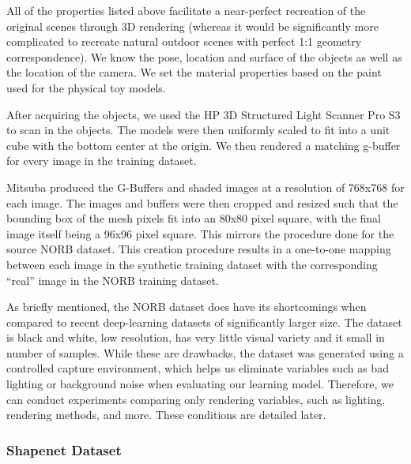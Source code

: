 \documentclass[10pt,twocolumn,letterpaper]{article}
\begin{document}
 All of the properties listed above facilitate a near-perfect recreation of the original scenes through 3D rendering (whereas it would be significantly more complicated to recreate natural outdoor scenes with perfect 1:1 geometry correspondence). We know the pose, location and surface of the objects as well as the location of the camera. We set the material properties based on the paint used for the physical toy models.
 
After acquiring the objects, we used the HP 3D Structured Light Scanner Pro S3\cite{HPSCANNER} to scan in the objects. The models were then uniformly scaled to fit into a unit cube with the bottom center at the origin. We then rendered a matching g-buffer for every image in the training dataset.  

Mitsuba produced the G-Buffers and shaded images at a resolution of 768x768 for each image.  The images and buffers were then cropped and resized such that the bounding box of the mesh pixels fit into an 80x80 pixel square, with the final image itself being a 96x96 pixel square. This mirrors the procedure done for the source NORB dataset. This creation procedure results in a one-to-one mapping between each image in the synthetic training dataset with the corresponding ``real'' image in the NORB training dataset.

As briefly mentioned, the NORB dataset does have its shortcomings when compared to recent deep-learning datasets of significantly larger size. The dataset is black and white, low resolution, has very little visual variety and it small in number of samples. While these are drawbacks, the dataset was generated using a controlled capture environment, which helps us eliminate variables such as bad lighting or background noise when evaluating our learning model. Therefore, we can conduct experiments comparing only rendering variables, such as lighting, rendering methods, and more. These conditions are detailed later.

\subsubsection{Shapenet Dataset}
\end{document}
